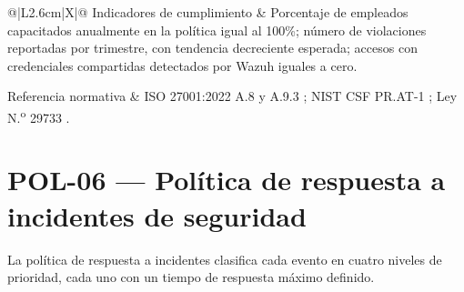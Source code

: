 \documentclass[11pt, a4paper, oneside]{report}
\begin{document}
\begin{xltabular}{\textwidth}{@{}|L{2.6cm}|X|@{}}
{\small Indicadores de cumplimiento} & {\small Porcentaje de empleados capacitados anualmente en la política igual al 100\%; número de violaciones reportadas por trimestre, con tendencia decreciente esperada; accesos con credenciales compartidas detectados por Wazuh iguales a cero.} \\ \hline

{\small Referencia normativa} & {\small ISO 27001:2022 A.8 y A.9.3 \citep{iso27001}; NIST CSF PR.AT-1 \citep{nistcsf}; Ley N.\textsuperscript{o} 29733 \citep{ley29733}.} \\ \hline

\end{xltabular}

\normalsize

\section{POL-06 — Política de respuesta a incidentes de seguridad}

La política de respuesta a incidentes clasifica cada evento en cuatro niveles de prioridad, cada uno con un tiempo de respuesta máximo definido.

\renewcommand{\arraystretch}{1.3}
\footnotesize
{}
\end{document}
